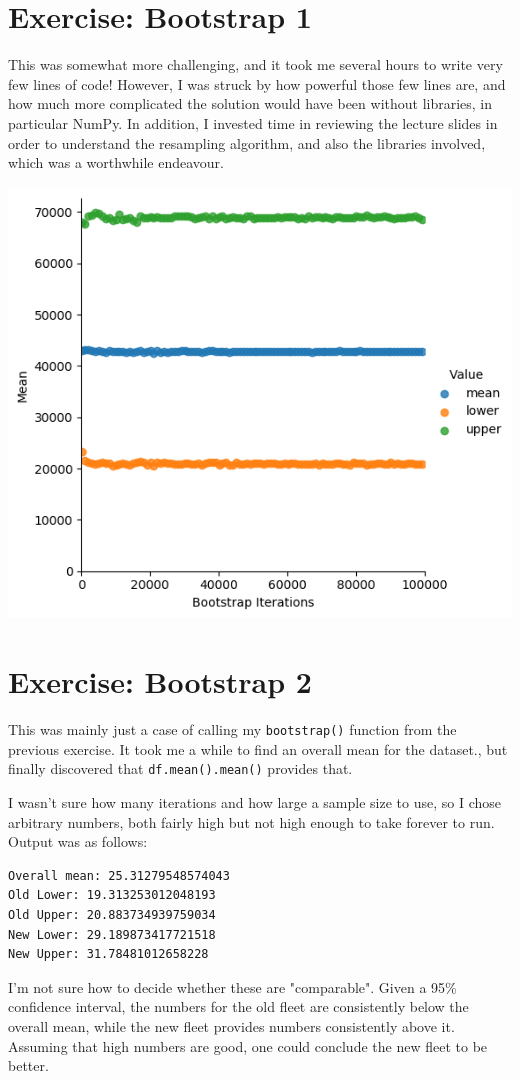 \documentclass[a4paper]{article}
\begin{document}
\section{Exercise: Bootstrap 1}

This was somewhat more challenging, and it took me several hours to write very few lines of code! However, I was struck by how powerful those few lines are, and how much more complicated the solution would have been without libraries, in particular NumPy. In addition, I invested time in reviewing the lecture slides in order to understand the resampling algorithm, and also the libraries involved, which was a worthwhile endeavour.

\begin{center}
   \includegraphics[scale=0.6]{bootstrap_confidence.png}
\end{center}

\section{Exercise: Bootstrap 2}

This was mainly just a case of calling my \texttt{bootstrap()} function from the previous exercise. It took me a while to find an overall mean for the dataset., but finally discovered that \texttt{df.mean().mean()} provides that.

I wasn't sure how many iterations and how large a sample size to use, so I chose arbitrary numbers, both fairly high but not high enough to take forever to run. Output was as follows:

\begin{verbatim}
Overall mean: 25.31279548574043
Old Lower: 19.313253012048193
Old Upper: 20.883734939759034
New Lower: 29.189873417721518
New Upper: 31.78481012658228
\end{verbatim}

I'm not sure how to decide whether these are "comparable". Given a 95\% confidence interval, the numbers for the old fleet are consistently below the overall mean, while the new fleet provides numbers consistently above it. Assuming that high numbers are good, one could conclude the new fleet to be better.
\end{document}

